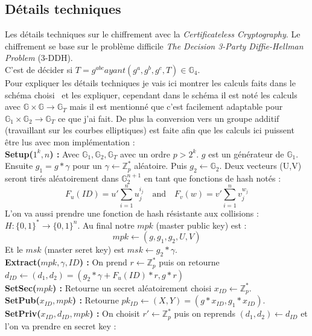 \subsection{Détails techniques}
Les détails techniques sur le chiffrement avec la \textit{Certificateless Cryptography}.
Le chiffrement se base sur le problème difficile \textit{The Decision 3-Party Diffie-Hellman Problem} (3-DDH). \\C'est de décider si $T =g^{abc} ayant (g^a, g^b, g^c, T) \in \mathbb{G}_4$.\\
Pour expliquer les détails techniques je vais ici montrer les calculs faits dans le schéma choisi~\cite{DBLP:conf/pkc/DentLP08} et les expliquer, cependant dans le schéma il est noté les calculs avec $\mathbb{G} \times \mathbb{G} \rightarrow \mathbb{G}_T$ mais il est mentionné que c'est facilement adaptable pour $\mathbb{G}_1 \times \mathbb{G}_2 \rightarrow \mathbb{G}_T$ ce que j'ai fait. De plus la conversion vers un groupe additif (travaillant sur les courbes elliptiques) est faite afin que les calculs ici puissent être lus avec mon implémentation :\\
\textbf{Setup($1^k, n$) :} Avec $\mathbb{G}_1, \mathbb{G}_2, \mathbb{G}_T$ avec un ordre $p > 2^k$. $g$ est un générateur de $\mathbb{G}_1$. Ensuite  $g_1 = g * \gamma$ pour un $\gamma \leftarrow  \mathbb{Z}_p^*$ aléatoire. Puis $g_2 \leftarrow \mathbb{G}_2$. Deux vecteurs (U,V) seront tirés aléatoirement dans $\mathbb{G}_2^{n+1}$ en tant que fonctions de hash notés :
\[F_u(ID) = u' \sum_{i=1}^{n} u_j^{i_j}\quad\mathrm{and}\quad F_v(w) = v' \sum_{i=1}^{n} v_j^{w_j}\]
L'on va aussi prendre une fonction de hash résistante aux collisions : $H : \{0,1\}^* \rightarrow \{0,1\}^n$. Au final notre $mpk$ (master public key) est :
\[mpk \leftarrow (g, g_1, g_2, U, V)\]
Et le $msk$ (master seret key) est $msk \leftarrow g_2*\gamma$.\\
\textbf{Extract($mpk, \gamma, ID$) :} On prend $r \leftarrow \mathbb{Z}_p^*$ puis on retourne $d_{ID} \leftarrow (d_1, d_2) = (g_2*\gamma + F_u(ID)*r, g*r)$\\
\textbf{SetSec($mpk$) :} Retourne un secret aléatoirement choisi $x_{ID} \leftarrow \mathbb{Z}_p^*$.\\
\textbf{SetPub($x_{ID}, mpk$) :} Retourne $pk_{ID} \leftarrow (X,Y) = (g*x_{ID}, g_1*x_{ID})$.\\
\textbf{SetPriv($x_{ID}, d_{ID}, mpk$) :} On choisit $r' \leftarrow \mathbb{Z}_p^*$ puis on reprends $(d_1, d_2) \leftarrow d_{ID}$ et l'on va prendre en secret key : 
